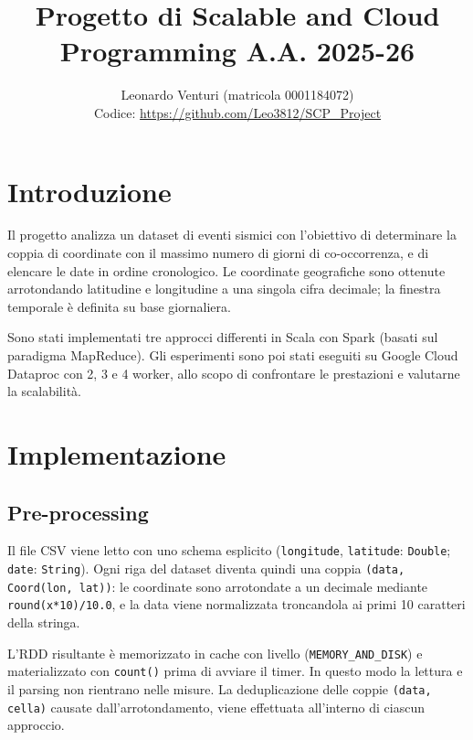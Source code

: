 \documentclass[10pt,a4paper]{article}
\title{\vspace{-1.2cm}Progetto di Scalable and Cloud Programming A.A. 2025-26 }
\author{
    Leonardo Venturi (matricola 0001184072)\\
    \small Codice: \url{https://github.com/Leo3812/SCP_Project}
}
\date{}
\begin{document}
\maketitle
\vspace{-0.8cm}

\section{Introduzione}
Il progetto analizza un dataset di eventi sismici con l'obiettivo di determinare la coppia di coordinate con il massimo numero di giorni di co-occorrenza, e di elencare le date in ordine cronologico. Le coordinate geografiche sono ottenute arrotondando latitudine e longitudine a una singola cifra decimale; la finestra temporale è definita su base giornaliera. 

Sono stati implementati tre approcci differenti in Scala con Spark (basati sul paradigma MapReduce). Gli esperimenti sono poi stati eseguiti su Google Cloud Dataproc con 2, 3 e 4 worker, allo scopo di confrontare le prestazioni e valutarne la scalabilità.

\section{Implementazione}

\subsection{Pre-processing}
Il file CSV viene letto con uno schema esplicito (\texttt{longitude}, \texttt{latitude}: \texttt{Double}; \texttt{date}: \texttt{String}). Ogni riga del dataset diventa quindi una coppia \texttt{(data, Coord(lon, lat))}: le coordinate sono arrotondate a un decimale mediante \texttt{round(x*10)/10.0}, e la data viene normalizzata troncandola ai primi 10 caratteri della stringa.

L'RDD risultante è memorizzato in cache con livello (\texttt{MEMORY\_AND\_DISK}) e materializzato con \texttt{count()} prima di avviare il timer. In questo modo la lettura e il parsing non rientrano nelle misure. La deduplicazione delle coppie \texttt{(data, cella)} causate dall'arrotondamento, viene effettuata all'interno di ciascun approccio.
\end{document}
